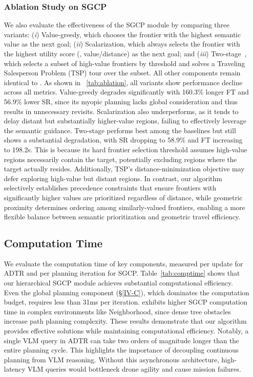\subsubsection{Ablation Study on SGCP}
We also evaluate the effectiveness of the SGCP module by comparing three variants: (\textit{i}) Value-greedy, which chooses the frontier with the highest semantic value as the next goal; 
(\textit{ii}) Scalarization, which always selects the frontier with the highest utility score (\ie, value/distance) as the next goal;
and (\textit{iii}) Two-stage~\cite{zhang2025apexnav}, which selects a subset of high-value frontiers by threshold and solves a Traveling Salesperson Problem (TSP) tour over the subset. All other components remain identical to \sysname. 
As shown in \tab~\ref{tab:ablation}, all variants show performance decline across all metrics.
Value-greedy degrades significantly with 160.3\% longer FT and 56.9\% lower SR, since its myopic planning lacks global consideration and thus results in unnecessary revisits. 
Scalarization also underperforms, as it tends to delay distant but substantially higher-value regions, failing to effectively leverage the semantic guidance.
Two-stage performs best among the baselines but still shows a substantial degradation, with SR dropping to 58.9\% and FT increasing to 198.2s. 
This is because its hard frontier selection threshold assumes high-value regions necessarily contain the target, potentially excluding regions where the target actually resides. Additionally, TSP's distance-minimization objective may defer exploring high-value but distant regions.
In contrast, our algorithm selectively establishes precedence constraints that ensure frontiers with significantly higher values are prioritized regardless of distance, while geometric proximity determines ordering among similarly-valued frontiers, enabling a more flexible balance between semantic prioritization and geometric travel efficiency.


\subsection{Computation Time }
We evaluate the computation time of key components, measured per update for ADTR and per planning iteration for SGCP.
Table~\ref{tab:comptime} shows that our hierarchical SGCP module achieves substantial computational efficiency. Even the global planning component (\S\ref{IV-C}), which dominates the computation budget, requires less than 31ms per iteration. 
\sysname exhibits higher SGCP computation time in complex environments like Neighborhood, since dense tree obstacles increase path planning complexity.
These results demonstrate that our algorithm provides effective solutions while maintaining computational efficiency.
Notably, a single VLM query in ADTR can take two orders of magnitude longer than the entire planning cycle. This highlights the importance of decoupling continuous planning from VLM reasoning. Without this asynchronous architecture, high-latency VLM queries would bottleneck drone agility and cause mission failures. 

